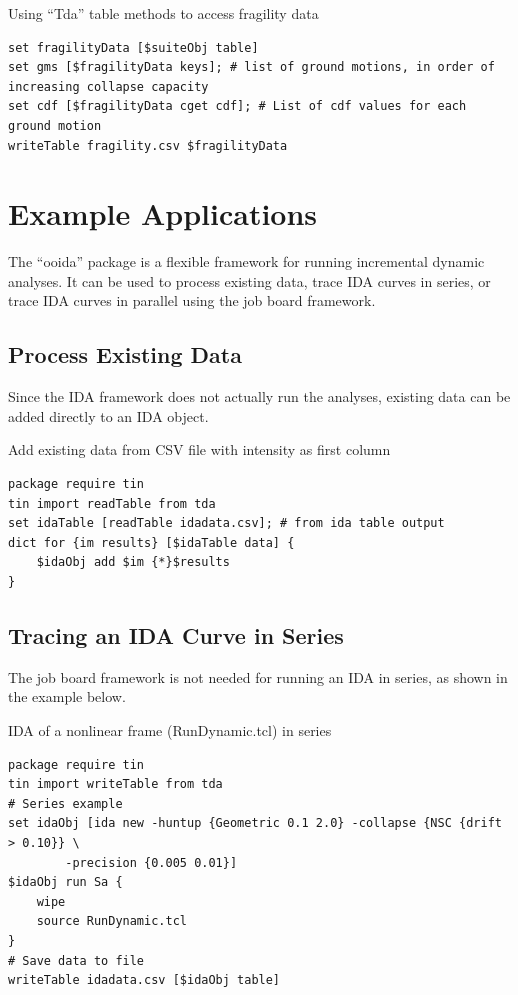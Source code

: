 \documentclass{article}
\renewcommand{\^}[1]{\textsuperscript{#1}}
\renewcommand{\_}[1]{\textsubscript{#1}}
\begin{document}
\begin{example}{Using ``Tda'' table methods to access fragility data}
\begin{lstlisting}
set fragilityData [$suiteObj table]
set gms [$fragilityData keys]; # list of ground motions, in order of increasing collapse capacity
set cdf [$fragilityData cget cdf]; # List of cdf values for each ground motion
writeTable fragility.csv $fragilityData
\end{lstlisting}
\end{example}

\clearpage	
\section{Example Applications}
The ``ooida'' package is a flexible framework for running incremental dynamic analyses.
It can be used to process existing data, trace IDA curves in series, or trace IDA curves in parallel using the job board framework.
\subsection{Process Existing Data}
Since the IDA framework does not actually run the analyses, existing data can be added directly to an IDA object.
\begin{example}{Add existing data from CSV file with intensity as first column}
\begin{lstlisting}
package require tin
tin import readTable from tda
set idaTable [readTable idadata.csv]; # from ida table output
dict for {im results} [$idaTable data] {
    $idaObj add $im {*}$results
}
\end{lstlisting}
\end{example}
\subsection{Tracing an IDA Curve in Series}
The job board framework is not needed for running an IDA in series, as shown in the example below.
\begin{example}{IDA of a nonlinear frame (RunDynamic.tcl) in series}
\begin{lstlisting}
package require tin
tin import writeTable from tda
# Series example
set idaObj [ida new -huntup {Geometric 0.1 2.0} -collapse {NSC {drift > 0.10}} \
        -precision {0.005 0.01}]
$idaObj run Sa {
    wipe 
    source RunDynamic.tcl
}
# Save data to file
writeTable idadata.csv [$idaObj table]
\end{lstlisting}
\end{example}
\clearpage
\end{document}
